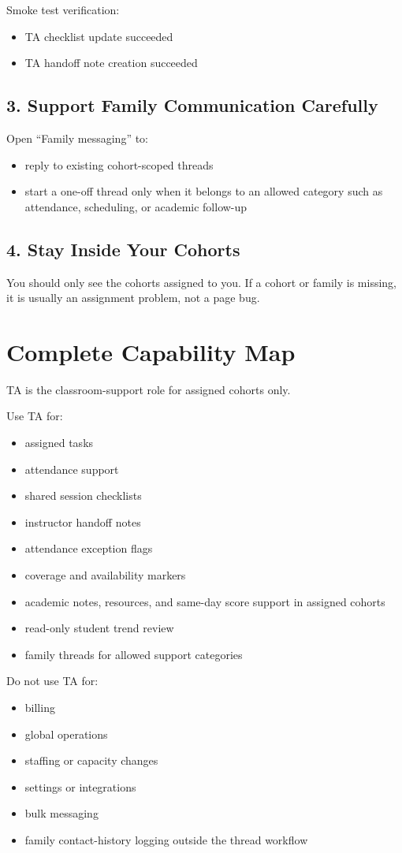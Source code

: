 \documentclass[11pt]{article}
\begin{document}
Smoke test verification:
\begin{itemize}
  \item TA checklist update succeeded
  \item TA handoff note creation succeeded
\end{itemize}

\subsection*{3. Support Family Communication Carefully}
Open ``Family messaging'' to:
\begin{itemize}
  \item reply to existing cohort-scoped threads
  \item start a one-off thread only when it belongs to an allowed category such as attendance, scheduling, or academic follow-up
\end{itemize}

\subsection*{4. Stay Inside Your Cohorts}
You should only see the cohorts assigned to you. If a cohort or family is missing, it is usually an assignment problem, not a page bug.

\section*{Complete Capability Map}
TA is the classroom-support role for assigned cohorts only.

Use TA for:
\begin{itemize}
  \item assigned tasks
  \item attendance support
  \item shared session checklists
  \item instructor handoff notes
  \item attendance exception flags
  \item coverage and availability markers
  \item academic notes, resources, and same-day score support in assigned cohorts
  \item read-only student trend review
  \item family threads for allowed support categories
\end{itemize}

Do not use TA for:
\begin{itemize}
  \item billing
  \item global operations
  \item staffing or capacity changes
  \item settings or integrations
  \item bulk messaging
  \item family contact-history logging outside the thread workflow
\end{itemize}
\end{document}
